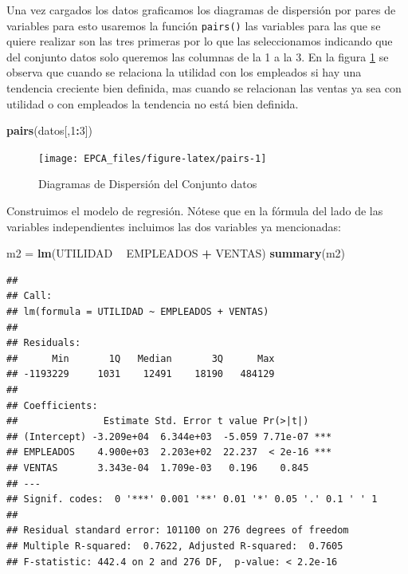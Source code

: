 \documentclass[letterpaper,]{book}
\newenvironment{Shaded}{\begin{snugshade}}{\end{snugshade}}
\newcommand{\DecValTok}[1]{\textcolor[rgb]{0.00,0.00,0.81}{#1}}
\newcommand{\KeywordTok}[1]{\textcolor[rgb]{0.13,0.29,0.53}{\textbf{#1}}}
\newcommand{\NormalTok}[1]{#1}
\newcommand{\OperatorTok}[1]{\textcolor[rgb]{0.81,0.36,0.00}{\textbf{#1}}}
\newcommand{\StringTok}[1]{\textcolor[rgb]{0.31,0.60,0.02}{#1}}
\begin{document}
Una vez cargados los datos graficamos los diagramas de dispersión por pares de variables para esto usaremos la función \texttt{pairs()} las variables para las que se quiere realizar son las tres primeras por lo que las seleccionamos indicando que del conjunto datos solo queremos las columnas de la 1 a la 3. En la figura \ref{fig:pairs} se observa que cuando se relaciona la utilidad con los empleados si hay una tendencia creciente bien definida, mas cuando se relacionan las ventas ya sea con utilidad o con empleados la tendencia no está bien definida.

\begin{Shaded}
\begin{Highlighting}[]
\KeywordTok{pairs}\NormalTok{(datos[,}\DecValTok{1}\OperatorTok{:}\DecValTok{3}\NormalTok{])}
\end{Highlighting}
\end{Shaded}

\begin{figure}[!h]

{\centering \texttt{[image: EPCA\_files/figure-latex/pairs-1]} 

}

\caption{Diagramas de Dispersión del Conjunto datos}\label{fig:pairs}
\end{figure}

Construimos el modelo de regresión. Nótese que en la fórmula del lado de las variables independientes incluimos las dos variables ya mencionadas:

\begin{Shaded}
\begin{Highlighting}[]
\NormalTok{m2 =}\StringTok{ }\KeywordTok{lm}\NormalTok{(UTILIDAD }\OperatorTok{~}\StringTok{ }\NormalTok{EMPLEADOS }\OperatorTok{+}\StringTok{ }\NormalTok{VENTAS)}
\KeywordTok{summary}\NormalTok{(m2)}
\end{Highlighting}
\end{Shaded}

\begin{verbatim}
## 
## Call:
## lm(formula = UTILIDAD ~ EMPLEADOS + VENTAS)
## 
## Residuals:
##      Min       1Q   Median       3Q      Max 
## -1193229     1031    12491    18190   484129 
## 
## Coefficients:
##               Estimate Std. Error t value Pr(>|t|)    
## (Intercept) -3.209e+04  6.344e+03  -5.059 7.71e-07 ***
## EMPLEADOS    4.900e+03  2.203e+02  22.237  < 2e-16 ***
## VENTAS       3.343e-04  1.709e-03   0.196    0.845    
## ---
## Signif. codes:  0 '***' 0.001 '**' 0.01 '*' 0.05 '.' 0.1 ' ' 1
## 
## Residual standard error: 101100 on 276 degrees of freedom
## Multiple R-squared:  0.7622, Adjusted R-squared:  0.7605 
## F-statistic: 442.4 on 2 and 276 DF,  p-value: < 2.2e-16
\end{verbatim}
\end{document}
